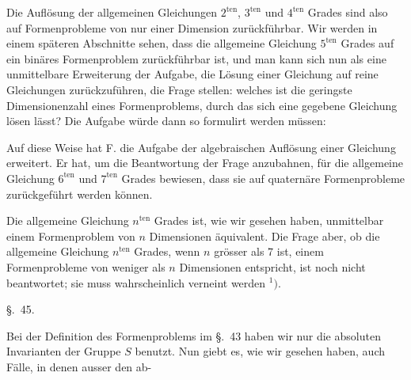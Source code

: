 Die Auflösung der allgemeinen Gleichungen $2^{\mathrm{ten}}$, $3^{\mathrm{ten}}$ und
$4^{\mathrm{ten}}$ Grades sind also auf Formenprobleme von nur einer Dimension zurückführbar. Wir werden in einem späteren Abschnitte
sehen, dass die allgemeine Gleichung $5^{\mathrm{ten}}$ Grades auf ein binäres
Formenproblem zurückführbar ist, und man kann sich nun als
eine unmittelbare Erweiterung der Aufgabe, die Lösung einer
Gleichung auf reine Gleichungen zurückzuführen, die Frage
stellen: welches ist die geringste Dimensionenzahl eines Formenproblems, durch das sich eine gegebene Gleichung lösen lässt?
Die Aufgabe würde dann so formulirt werden müssen:


Auf diese Weise hat F.  die Aufgabe der algebraischen
Auflösung einer Gleichung erweitert. Er hat, um die Beantwortung der Frage anzubahnen, für die allgemeine Gleichung
$6^{\mathrm{ten}}$ und $7^{\mathrm{ten}}$ Grades bewiesen, dass sie auf quaternäre Formenprobleme zurückgeführt werden können.

Die allgemeine Gleichung $n^{\mathrm{ten}}$ Grades ist, wie wir gesehen
haben, unmittelbar einem Formenproblem von $n$ Dimensionen
äquivalent. Die Frage aber, ob die allgemeine Gleichung $n^{\mathrm{ten}}$
Grades, wenn $n$ grösser als 7 ist, einem Formenprobleme von
weniger als $n$ Dimensionen entspricht, ist noch nicht beantwortet; sie muss wahrscheinlich verneint werden $^{1})$.

\begingroup
\renewcommand{\thefootnote}{1)}
\endgroup

\begin{center}
\S.\ 45.

\end{center}

Bei der Definition des Formenproblems im \S.\ 43 haben wir
nur die absoluten Invarianten der Gruppe $S$ benutzt. Nun giebt
es, wie wir gesehen haben, auch Fälle, in denen ausser den ab-
